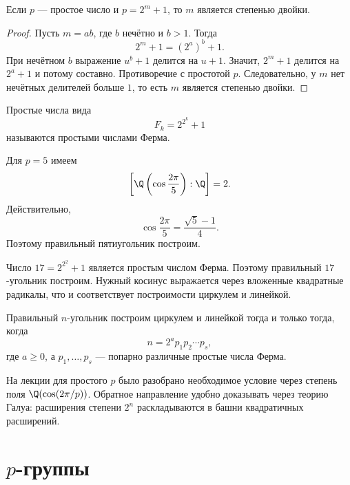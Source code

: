 \begin{stmt}
    Если $p$ --- простое число и $p=2^m+1$, то $m$ является степенью двойки.

    \begin{proof}
        Пусть $m=ab$, где $b$ нечётно и $b>1$. Тогда
        \[
            2^m+1=(2^a)^b+1.
        \]
        При нечётном $b$ выражение $u^b+1$ делится на $u+1$. Значит, $2^m+1$ делится на $2^a+1$ и потому составно.
        Противоречие с простотой $p$. Следовательно, у $m$ нет нечётных делителей больше $1$, то есть
        $m$ является степенью двойки.
    \end{proof}
\end{stmt}

\begin{definition}
    Простые числа вида
    \[
        F_k=2^{2^k}+1
    \]
    называются простыми числами Ферма.
\end{definition}

\begin{example}[Пятиугольник]
    Для $p=5$ имеем
    \[
        \left[\Q\left(\cos\frac{2\pi}{5}\right):\Q\right]=2.
    \]
    Действительно,
    \[
        \cos\frac{2\pi}{5}=\frac{\sqrt5-1}{4}.
    \]
    Поэтому правильный пятиугольник построим.
\end{example}

\begin{example}[Семнадцатиугольник]
    Число $17=2^{2^2}+1$ является простым числом Ферма. Поэтому правильный $17$-угольник построим. Нужный косинус выражается через вложенные
    квадратные радикалы,
    что и соответствует построимости циркулем и линейкой.
\end{example}

\begin{stmt}
    Правильный $n$-угольник построим циркулем и линейкой тогда и только тогда, когда
    \[
        n = 2^a p_1p_2\cdots p_s,
    \]
    где $a\ge0$, а $p_1,\ldots,p_s$ --- попарно различные простые числа Ферма.
\end{stmt}

\begin{remark}
    На лекции для простого $p$ было разобрано необходимое условие через степень поля $\Q(\cos(2\pi/p))$.
    Обратное направление удобно доказывать через теорию Галуа: расширения степени $2^n$ раскладываются в башни квадратичных расширений.
\end{remark}

\section{$p$-группы}

